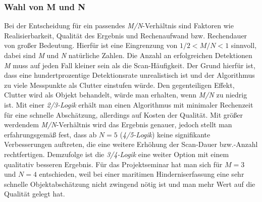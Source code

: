 \documentclass[10pt,a4paper]{article}
\begin{document}
\subsubsection{Wahl von M und N}
	Bei der Entscheidung für ein passendes \textit{M/N}-Verhältnis sind Faktoren wie Realisierbarkeit, Qualität des Ergebnis und Rechenaufwand bzw. Rechendauer von großer Bedeutung. Hierfür ist eine Eingrenzung von $1/2<M/N<1$ sinnvoll, dabei sind \textit{M} und \textit{N} natürliche Zahlen. Die Anzahl an erfolgreichen Detektionen \textit{M} muss auf jeden Fall kleiner sein als die Scan-Häufigkeit. Der Grund hierfür ist, dass eine hundertprozentige Detektionsrate unrealistisch ist und der Algorithmus zu viele Messpunkte als Clutter einstufen würde. Den gegenteiligen Effekt, Clutter wird als Objekt behandelt, würde man erhalten, wenn \textit{M/N} zu niedrig ist. Mit einer \textit{2/3-Logik} erhält man einen Algorithmus mit minimaler Rechenzeit für eine schnelle Abschätzung, allerdings auf Kosten der Qualität. Mit größer werdendem \textit{M/N}-Verhältnis wird das Ergebnis genauer, jedoch stellt man erfahrungsgemäß fest, dass ab $N=5$ (\textit{4/5-Logik}) keine signifikante Verbesserungen auftreten, die eine weitere Erhöhung der Scan-Dauer bzw.-Anzahl rechtfertigen. Demzufolge ist die \textit{3/4-Logik} eine weiter Option mit einem qualitativ besseren Ergebnis. Für das Projektseminar hat man sich für $M=3$ und $N=4$ entschieden, weil bei einer maritimen Hinderniserfassung eine sehr schnelle Objektabschätzung nicht zwingend nötig ist und man mehr Wert auf die Qualität gelegt hat.
\end{document}
